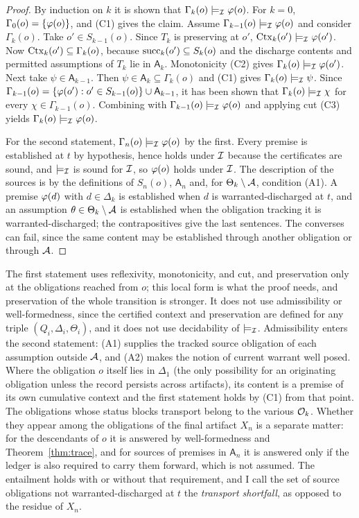 \begin{proof}
By induction on $k$ it is shown that $\Gamma_k(o) \models_{\mathcal{I}} \varphi(o)$. For $k=0$, $\Gamma_0(o) = \{\varphi(o)\}$, and (C1) gives the claim. Assume $\Gamma_{k-1}(o) \models_{\mathcal{I}} \varphi(o)$ and consider $\Gamma_k(o)$. Take $o' \in S_{k-1}(o)$. Since $T_k$ is preserving at $o'$, $\operatorname{Ctx}_k(o') \models_{\mathcal{I}} \varphi(o')$. Now $\operatorname{Ctx}_k(o') \subseteq \Gamma_k(o)$, because $\operatorname{succ}_k(o') \subseteq S_k(o)$ and the discharge contents and permitted assumptions of $T_k$ lie in $\mathsf{A}_k$. Monotonicity (C2) gives $\Gamma_k(o) \models_{\mathcal{I}} \varphi(o')$. Next take $\psi \in \mathsf{A}_{k-1}$. Then $\psi \in \mathsf{A}_k \subseteq \Gamma_k(o)$ and (C1) gives $\Gamma_k(o) \models_{\mathcal{I}} \psi$. Since $\Gamma_{k-1}(o) = \{\varphi(o') : o' \in S_{k-1}(o)\} \cup \mathsf{A}_{k-1}$, it has been shown that $\Gamma_k(o) \models_{\mathcal{I}} \chi$ for every $\chi \in \Gamma_{k-1}(o)$. Combining with $\Gamma_{k-1}(o) \models_{\mathcal{I}} \varphi(o)$ and applying cut (C3) yields $\Gamma_k(o) \models_{\mathcal{I}} \varphi(o)$.

For the second statement, $\Gamma_n(o)\models_{\mathcal{I}}\varphi(o)$ by the first. Every premise is established at $t$ by hypothesis, hence holds under $\mathcal{I}$ because the certificates are sound, and $\models_{\mathcal{I}}$ is sound for $\mathcal{I}$, so $\varphi(o)$ holds under $\mathcal{I}$. The description of the sources is by the definitions of $S_n(o)$, $\mathsf{A}_n$ and, for $\Theta_k\setminus\mathcal{A}$, condition (A1). A premise $\varphi(d)$ with $d\in\Delta_k$ is established when $d$ is warranted-discharged at $t$, and an assumption $\theta\in\Theta_k\setminus\mathcal{A}$ is established when the obligation tracking it is warranted-discharged; the contrapositives give the last sentences. The converses can fail, since the same content may be established through another obligation or through $\mathcal{A}$.
\end{proof}

The first statement uses reflexivity, monotonicity, and cut, and preservation only at the obligations reached from $o$; this local form is what the proof needs, and preservation of the whole transition is stronger. It does not use admissibility or well-formedness, since the certified context and preservation are defined for any triple $(Q_i,\Delta_i,\Theta_i)$, and it does not use decidability of $\models_{\mathcal{I}}$. Admissibility enters the second statement: (A1) supplies the tracked source obligation of each assumption outside $\mathcal{A}$, and (A2) makes the notion of current warrant well posed. Where the obligation $o$ itself lies in $\Delta_1$ (the only possibility for an originating obligation unless the record persists across artifacts), its content is a premise of its own cumulative context and the first statement holds by (C1) from that point. The obligations whose status blocks transport belong to the various $\mathcal{O}_k$. Whether they appear among the obligations of the final artifact $X_n$ is a separate matter: for the descendants of $o$ it is answered by well-formedness and Theorem~\ref{thm:trace}, and for sources of premises in $\mathsf{A}_n$ it is answered only if the ledger is also required to carry them forward, which is not assumed. The entailment holds with or without that requirement, and I call the set of source obligations not warranted-discharged at $t$ the \emph{transport shortfall}, as opposed to the residue of $X_n$.

